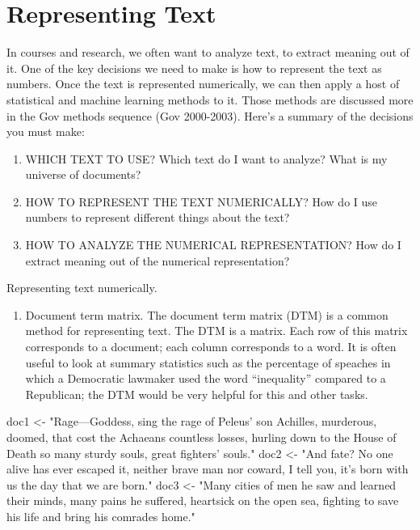 \documentclass[]{book}
\newenvironment{Shaded}{\begin{snugshade}}{\end{snugshade}}
\newcommand{\NormalTok}[1]{#1}
\newcommand{\StringTok}[1]{\textcolor[rgb]{0.31,0.60,0.02}{#1}}
\providecommand{\tightlist}{%
  \setlength{\itemsep}{0pt}\setlength{\parskip}{0pt}}
\theoremstyle{definition}
\theoremstyle{definition}
\theoremstyle{definition}
\theoremstyle{remark}
\begin{document}
\hypertarget{representing-text}{%
\section{Representing Text}\label{representing-text}}

In courses and research, we often want to analyze text, to extract meaning out of it.
One of the key decisions we need to make is how to represent the text as numbers.
Once the text is represented numerically, we can then apply a host of statistical
and machine learning methods to it. Those methods are discussed more in the Gov methods sequence (Gov 2000-2003). Here's a summary of the decisions you must make:

\begin{enumerate}
\def\labelenumi{\arabic{enumi}.}
\tightlist
\item
  WHICH TEXT TO USE? Which text do I want to analyze? What is my universe of documents?
\item
  HOW TO REPRESENT THE TEXT NUMERICALLY? How do I use numbers to represent different things about the text?
\item
  HOW TO ANALYZE THE NUMERICAL REPRESENTATION? How do I extract meaning out of the numerical representation?
\end{enumerate}

Representing text numerically.

\begin{enumerate}
\def\labelenumi{\arabic{enumi}.}
\tightlist
\item
  Document term matrix. The document term matrix (DTM) is a common method for representing text. The DTM is a matrix. Each row of this matrix corresponds to a document; each column corresponds to a word. It is often useful to look at summary statistics such as the percentage of speaches in which a Democratic lawmaker used the word ``inequality'' compared to a Republican; the DTM would be very helpful for this and other tasks.
\end{enumerate}

\begin{Shaded}
\begin{Highlighting}[]
\NormalTok{doc1 <-}\StringTok{ "Rage---Goddess, sing the rage of Peleus’ son Achilles,}
\StringTok{         murderous, doomed, that cost the Achaeans countless losses,}
\StringTok{         hurling down to the House of Death so many sturdy souls,}
\StringTok{         great fighters’ souls."}
\NormalTok{doc2 <-}\StringTok{ "And fate? No one alive has ever escaped it,}
\StringTok{         neither brave man nor coward, I tell you, }
\StringTok{         it's born with us the day that we are born."}
\NormalTok{doc3 <-}\StringTok{ "Many cities of men he saw and learned their minds,}
\StringTok{         many pains he suffered, heartsick on the open sea,}
\StringTok{         fighting to save his life and bring his comrades home."}
\end{Highlighting}
\end{Shaded}
\end{document}
